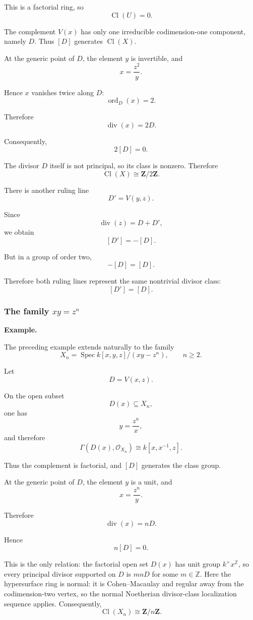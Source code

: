 This is a factorial ring, so
\[
\operatorname{Cl}(U)=0.
\]

The complement \(V(x)\) has only one irreducible codimension-one component, namely \(D\). Thus \([D]\) generates \(\operatorname{Cl}(X)\).

At the generic point of \(D\), the element \(y\) is invertible, and
\[
x=\frac{z^2}{y}.
\]

Hence \(x\) vanishes twice along \(D\):
\[
\operatorname{ord}_D(x)=2.
\]

Therefore
\[
\operatorname{div}(x)=2D.
\]

Consequently,
\[
2[D]=0.
\]

The divisor \(D\) itself is not principal, so its class is nonzero. Therefore
\[
\boxed{
	\operatorname{Cl}(X)\cong\mathbf Z/2\mathbf Z.
}
\]

There is another ruling line
\[
D'=V(y,z).
\]

Since
\[
\operatorname{div}(z)=D+D',
\]
we obtain
\[
[D']=-[D].
\]

But in a group of order two,
\[
-[D]=[D].
\]

Therefore both ruling lines represent the same nontrivial divisor class:
\[
[D']=[D].
\]

\subsubsection{\texorpdfstring{The family \(xy=z^n\)}{The family xy=zn}}

\textbf{Example.}

The preceding example extends naturally to the family
\[
X_n
=
\operatorname{Spec}
k[x,y,z]/(xy-z^n),
\qquad n\geq 2.
\]

Let
\[
D=V(x,z).
\]

On the open subset
\[
D(x)\subseteq X_n,
\]
one has
\[
y=\frac{z^n}{x},
\]
and therefore
\[
\Gamma(D(x),\mathcal O_{X_n})
\cong
k[x,x^{-1},z].
\]

Thus the complement is factorial, and \([D]\) generates the class group.

At the generic point of \(D\), the element \(y\) is a unit, and
\[
x=\frac{z^n}{y}.
\]

Therefore
\[
\operatorname{div}(x)=nD.
\]

Hence
\[
n[D]=0.
\]

This is the only relation: the factorial open set \(D(x)\) has
unit group \(k^\times x^{\mathbb Z}\), so every principal divisor
supported on \(D\) is \(mnD\) for some \(m\in\mathbb Z\).
Here the hypersurface ring is normal: it is Cohen--Macaulay
and regular away from the codimension-two vertex, so the
normal Noetherian divisor-class localization sequence applies.
Consequently,
\[
\boxed{
	\operatorname{Cl}(X_n)\cong\mathbf Z/n\mathbf Z.
}
\]

